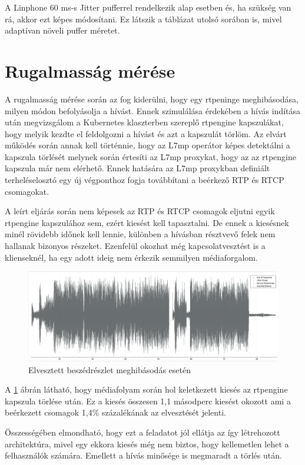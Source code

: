 A Linphone 60 ms-s Jitter pufferrel rendelkezik alap esetben és, ha szükség van rá, akkor 
ezt képes módosítani. Ez látszik a táblázat utolsó sorában is, mivel adaptívan növeli 
puffer méretet.

\section{Rugalmasság mérése}

A rugalmasság mérése során az fog kiderülni, hogy egy rtpeninge meghibásodása, milyen 
módon befolyásolja a hívást. Ennek szimulálása érdekében a hívás indítása után 
megvizsgálom a Kubernetes klaszterben szereplő rtpengine kapszulákat, hogy melyik kezdte 
el feldolgozni a hívást és azt a kapszulát törlöm. Az elvárt működés során annak kell 
történnie, hogy az L7mp operátor képes detektálni a kapszula törlését melynek során 
értesíti az L7mp proxykat, hogy az az rtpengine kapszula már nem elérhető. Ennek hatására 
az L7mp proxykban definiált terheléselosztó egy új végponthoz fogja továbbítani a 
beérkező RTP és RTCP csomagokat. 

A leírt eljárás során nem képesek az RTP és RTCP csomagok eljutni egyik rtpengine 
kapszulához sem, ezért kiesést kell tapasztalni. De ennek a kiesésnek minél rövidebb 
időnek kell lennie, különben a hívásban résztvevő felek nem hallanak bizonyos részeket. 
Ezenfelül okozhat még kapcsolatvesztést is a klienseknél, ha egy adott ideig nem érkezik 
semmilyen médiaforgalom. 

\begin{figure}[!ht]
	\centering
	\includegraphics[width=1\textwidth, keepaspectratio]{figures/res.png}
	\caption{Elvesztett beszédrészlet meghibásodás esetén}
	\label{fig:res}
\end{figure}

A \ref{fig:res} ábrán látható, hogy médiafolyam során hol keletkezett kiesés az rtpengine kapszula törlése után. Ez a kiesés összesen 1,1 másodperc kiesést okozott ami a beérkezett csomagok 1,4\% százalékának az elvesztését jelenti.

Összességében elmondható, hogy ezt a feladatot jól ellátja az így létrehozott architektúra, mivel egy ekkora kiesés még nem biztos, hogy kellemetlen lehet a felhasználók számára. Emellett a hívás minősége is megmaradt a törlés után. 